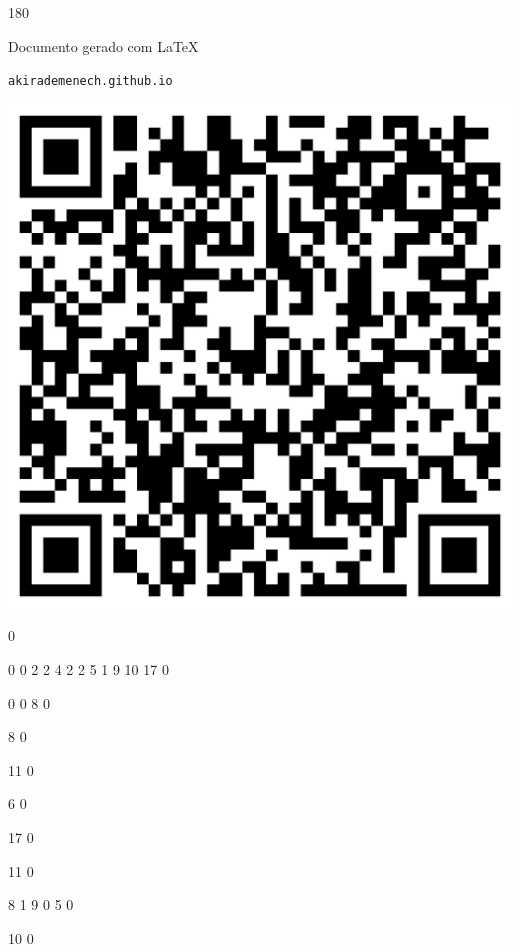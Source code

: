 \documentclass[12pt]{article}
\begin{document}
	\begin{turn}{180}	
		\begin{minipage}{\textwidth}		  
		  Documento gerado com \LaTeX			
		  
		  \texttt{akirademenech.github.io}

		  \includegraphics[height=0.3\textheight]{2e-2.pdf}

		\end{minipage}	
	\end{turn}  
		  
		\vfill  
		  
{
	0	%

	0	%
	0	%
	2	%
	2	%
	4	%
	2	%
	2	%
	5	%
	1	%
	9	%
	10	%
	17	%
	0	%

	0	%
	0	%
	8	%
	0	%

	8	%
	0	%

	11	%
	0	%

	6	%
	0	%

	17	%
	0	%

	11	%
	0	%

	8	%
	1	%
	9	%
	0	%
	5	%
	0	%

	10	%
	0	%

}	  
		    	
\end{document}
